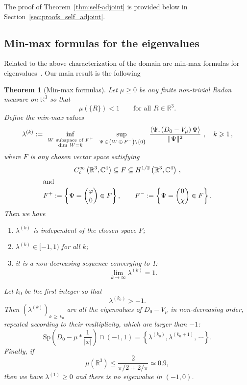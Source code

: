 \documentclass[10pt]{amsart}
\newtheorem{theo}[cdrthm]{Theorem}
\theoremstyle{definition}
\newcommand{\R}{\mathbb{R}}
\newcommand{\C}{\mathbb{C}}
\newcommand{\Spec}{\mathrm{Sp}}
\newcommand\1{{\ensuremath {\mathds 1} }}
\renewcommand\phi{\varphi}
\newcommand{\ii}{\infty}
\newcommand\pscal[1]{{\ensuremath{\left\langle #1 \right\rangle}}}
\renewcommand{\geq}{\geqslant}
\renewcommand{\leq}{\leqslant}
\newcommand*{\romanenumi}{\renewcommand*{\theenumi}{\roman{enumi}}}
\begin{document}
The proof of Theorem~\ref{thm:self-adjoint} is provided below in Section~\ref{sec:proofs_self_adjoint}.


\subsection{Min-max formulas for the eigenvalues}

Related to the above characterization of the domain are min-max formulas for eigenvalues~\cite{DolEstSer-00, DolEstSer-00a, DolEstSer-03, DolEstSer-06,EstLewSer-19,GriSie-99,MorMul-15,Muller-16,SchSolTok-20}. Our main result is the following

\begin{theo}[Min-max formulas]\label{thm:min-max}
Let $\mu\geq0$ be any finite non-trivial Radon measure on $\R^3$ so that
\[
\mu(\{R\})<1\qquad \text{for all }R\in\R^3.
\]
Define the min-max values
\begin{equation}\label{eq:min-max}
\lambda^{(k)} := \ \inf_{
\scriptstyle W \ \text{subspace of } F^+ \atop \scriptstyle {\rm dim}
\ W = k } \ \sup_{\,\scriptstyle\,\Psi\,\in\,\left(W\,\oplus\,F^-\right) \setminus \{ 0 \} } \
\frac{\pscal{\Psi, (D_0-V_\mu)\,\Psi}}{\|\Psi\|^2} \ ,
\quad k \geq 1\,,
\end{equation}
where $F$ is any chosen vector space satisfying
\begin{gather*}\label{telesc}
C^\ii_c\left(\R^3,\C^4\right)\subseteq F \subseteq H^{1/2}\left(\R^3,\C^4\right)\,,
\\
\intertext{and}
F^+:=\left\{\Psi=
\binom
{\phi}{0}\in F\right\},\qquad F^-:=\left\{\Psi=
\binom{0}{\chi}\in F\right\}.
\end{gather*}
Then we have
\begin{enumerate}\romanenumi
\item $\lambda^{(k)}$ is independent of the chosen space $F$;
\item $\lambda^{(k)}\in[-1,1)$ for all $k$;
\item it is a non-decreasing sequence converging to 1:
\begin{equation}\label{eq:limit_lambda_k}
\lim_{k\to\ii}\lambda^{(k)}=1.
\end{equation}
\end{enumerate}
Let $k_0$ be the first integer so that
\[
\lambda^{(k_0)}>-1.
\]
Then $(\lambda^{(k)})_{k\,\geq\,k_0}$ are all the eigenvalues of $D_0-V_\mu$ in non-decreasing order, repeated according to their multiplicity, which are larger than $-1$:
\[
\Spec\left(D_0-\mu\ast\frac1{|x|}\right)\cap (-1,1)=
\left\{\lambda^{(k_0)}, \lambda^{(k_0+1)},\,\cdots\right\}.
\]
Finally, if
\begin{equation}\label{eq:condition_Tix}
\mu(\R^3)\leq \frac{2}{\pi/2+2/\pi}\simeq 0.9,
\end{equation}
then we have $\lambda^{(1)}\geq0$ and there is no eigenvalue in $(-1,0)$.
\end{theo}
\end{document}
